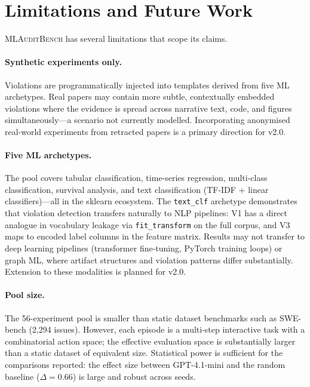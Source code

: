 \documentclass{article}
\begin{document}
\section{Limitations and Future Work}
\label{sec:limitations}

\textsc{MLAuditBench} has several limitations that scope its claims.

\paragraph{Synthetic experiments only.}
Violations are programmatically injected into templates derived from five ML archetypes.
Real papers may contain more subtle, contextually embedded violations where the evidence is spread across narrative text, code, and figures simultaneously---a scenario not currently modelled.
Incorporating anonymised real-world experiments from retracted papers is a primary direction for v2.0.

\paragraph{Five ML archetypes.}
The pool covers tabular classification, time-series regression, multi-class classification, survival analysis, and text classification (TF-IDF + linear classifiers)---all in the sklearn ecosystem.
The \texttt{text\_clf} archetype demonstrates that violation detection transfers naturally to NLP pipelines: V1 has a direct analogue in vocabulary leakage via \texttt{fit\_transform} on the full corpus, and V3 maps to encoded label columns in the feature matrix.
Results may not transfer to deep learning pipelines (transformer fine-tuning, PyTorch training loops) or graph ML, where artifact structures and violation patterns differ substantially.
Extension to these modalities is planned for v2.0.

\paragraph{Pool size.}
The 56-experiment pool is smaller than static dataset benchmarks such as SWE-bench (2,294 issues).
However, each episode is a multi-step interactive task with a combinatorial action space; the effective evaluation space is substantially larger than a static dataset of equivalent size.
Statistical power is sufficient for the comparisons reported: the effect size between GPT-4.1-mini and the random baseline ($\Delta = 0.66$) is large and robust across seeds.
\end{document}
